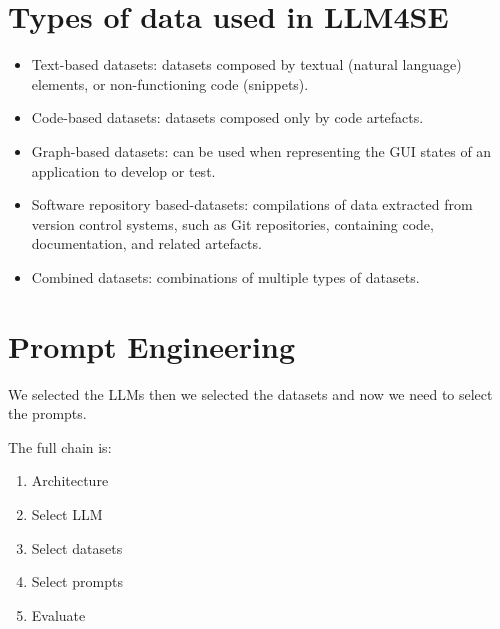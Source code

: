 \section{Types of data used in LLM4SE}
\begin{itemize}
  \item Text-based datasets: datasets composed by textual (natural language)
        elements, or non-functioning code (snippets).

  \item Code-based datasets: datasets composed only by code artefacts.


  \item Graph-based datasets: can be used when representing the GUI states of an
        application to develop or test.

  \item Software repository based-datasets: compilations of data extracted from
        version control systems, such as Git repositories, containing code,
        documentation, and related artefacts.

  \item Combined datasets: combinations of multiple types of datasets.
\end{itemize}


\section{Prompt Engineering}

We selected the LLMs then we selected the datasets and now we need to select the prompts.

The full chain is:

\begin{enumerate}
  \item Architecture
  \item Select LLM
  \item Select datasets
  \item Select prompts
  \item Evaluate
\end{enumerate}



